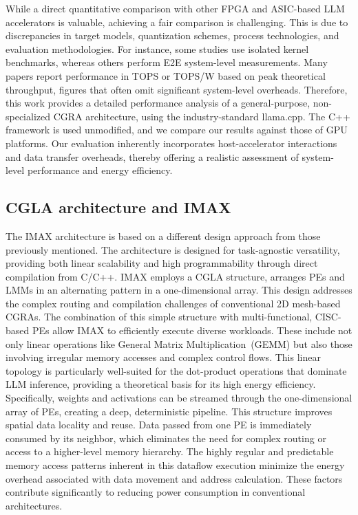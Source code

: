 While a direct quantitative comparison with other FPGA and ASIC-based LLM accelerators is valuable, achieving a fair comparison is challenging.
This is due to discrepancies in target models, quantization schemes, process technologies, and evaluation methodologies.
For instance, some studies use isolated kernel benchmarks, whereas others perform E2E system-level measurements.
Many papers report performance in TOPS or TOPS/W based on peak theoretical throughput, figures that often omit significant system-level overheads.
Therefore, this work provides a detailed performance analysis of a general-purpose, non-specialized CGRA architecture, using the industry-standard llama.cpp. 
The C++ framework is used unmodified, and we compare our results against those of GPU platforms. 
Our evaluation inherently incorporates host-accelerator interactions and data transfer overheads, thereby offering a realistic assessment of system-level performance and energy efficiency.


  

  
  

\subsection{CGLA architecture and IMAX}
The IMAX architecture is based on a different design approach from those previously mentioned.
The architecture is designed for task-agnostic versatility, providing both linear scalability and high programmability through direct compilation from C/C++.
IMAX employs a CGLA structure, arranges PEs and LMMs in an alternating pattern in a one-dimensional array. 
This design addresses the complex routing and compilation challenges of conventional 2D mesh-based CGRAs.
The combination of this simple structure with multi-functional, CISC-based PEs allow IMAX to efficiently execute diverse workloads. 
These include not only linear operations like General Matrix Multiplication~(GEMM) but also those involving irregular memory accesses and complex control flows.
This linear topology is particularly well-suited for the dot-product operations that dominate LLM inference, providing a theoretical basis for its high energy efficiency. 
Specifically, weights and activations can be streamed through the one-dimensional array of PEs, creating a deep, deterministic pipeline. 
This structure improves spatial data locality and reuse. 
Data passed from one PE is immediately consumed by its neighbor, which eliminates the need for complex routing or access to a higher-level memory hierarchy.
The highly regular and predictable memory access patterns inherent in this dataflow execution minimize the energy overhead associated with data movement and address calculation. 
These factors contribute significantly to reducing power consumption in conventional architectures.


